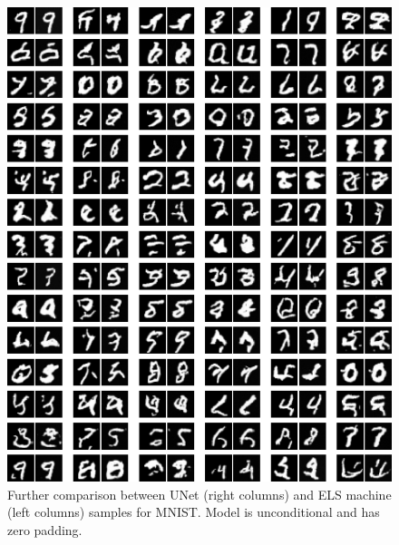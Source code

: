 \documentclass{article}
\theoremstyle{plain}
\theoremstyle{definition}
\theoremstyle{remark}
\begin{document}
\begin{figure}
    \centering
    \includegraphics[width=0.9\linewidth]{mnist_zeros_samps_unet_m.png}
    \caption{Further comparison between UNet (right columns) and ELS machine (left columns) samples for MNIST. Model is unconditional and has zero padding.}
    \label{fig:unet-mnist-zeros}
\end{figure}
\end{document}
